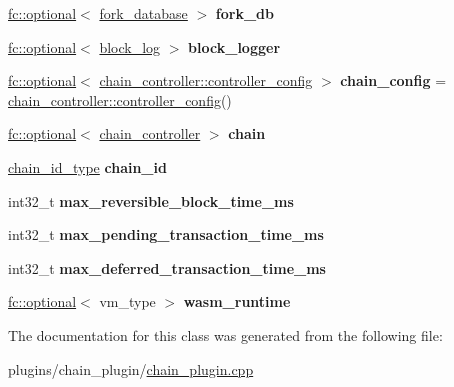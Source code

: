 \begin{DoxyCompactItemize}
\mbox{\hyperlink{classfc_1_1optional}{fc\+::optional}}$<$ \mbox{\hyperlink{classaacio_1_1chain_1_1fork__database}{fork\+\_\+database}} $>$ {\bfseries fork\+\_\+db}
\item 
\mbox{\label{classaacio_1_1chain__plugin__impl_a4adbe7e0cdf45aec7085f29c8d2f730e}} 
\mbox{\hyperlink{classfc_1_1optional}{fc\+::optional}}$<$ \mbox{\hyperlink{classaacio_1_1chain_1_1block__log}{block\+\_\+log}} $>$ {\bfseries block\+\_\+logger}
\item 
\mbox{\label{classaacio_1_1chain__plugin__impl_a08ed7789f78b4354cf7580ceaa23238c}} 
\mbox{\hyperlink{classfc_1_1optional}{fc\+::optional}}$<$ \mbox{\hyperlink{structaacio_1_1chain_1_1chain__controller_1_1controller__config}{chain\+\_\+controller\+::controller\+\_\+config}} $>$ {\bfseries chain\+\_\+config} = \mbox{\hyperlink{structaacio_1_1chain_1_1chain__controller_1_1controller__config}{chain\+\_\+controller\+::controller\+\_\+config}}()
\item 
\mbox{\label{classaacio_1_1chain__plugin__impl_a2e18628e7a2b8b3c78e1617d0afff363}} 
\mbox{\hyperlink{classfc_1_1optional}{fc\+::optional}}$<$ \mbox{\hyperlink{classaacio_1_1chain_1_1chain__controller}{chain\+\_\+controller}} $>$ {\bfseries chain}
\item 
\mbox{\label{classaacio_1_1chain__plugin__impl_aae2a37510dcc295865347d17ff3ec844}} 
\mbox{\hyperlink{classfc_1_1sha256}{chain\+\_\+id\+\_\+type}} {\bfseries chain\+\_\+id}
\item 
\mbox{\label{classaacio_1_1chain__plugin__impl_aa88207c3d395dede2762c649bf294e8f}} 
int32\+\_\+t {\bfseries max\+\_\+reversible\+\_\+block\+\_\+time\+\_\+ms}
\item 
\mbox{\label{classaacio_1_1chain__plugin__impl_a99e8b32f449a8e97fe7e72d73a02fc4b}} 
int32\+\_\+t {\bfseries max\+\_\+pending\+\_\+transaction\+\_\+time\+\_\+ms}
\item 
\mbox{\label{classaacio_1_1chain__plugin__impl_a094d19a7e0bd68ae4602451cd81832bc}} 
int32\+\_\+t {\bfseries max\+\_\+deferred\+\_\+transaction\+\_\+time\+\_\+ms}
\item 
\mbox{\label{classaacio_1_1chain__plugin__impl_ae7b4af552f124d4f857385770f3cde52}} 
\mbox{\hyperlink{classfc_1_1optional}{fc\+::optional}}$<$ vm\+\_\+type $>$ {\bfseries wasm\+\_\+runtime}
\end{DoxyCompactItemize}


The documentation for this class was generated from the following file\+:\begin{DoxyCompactItemize}
\item 
plugins/chain\+\_\+plugin/\mbox{\hyperlink{chain__plugin_8cpp}{chain\+\_\+plugin.\+cpp}}\end{DoxyCompactItemize}
